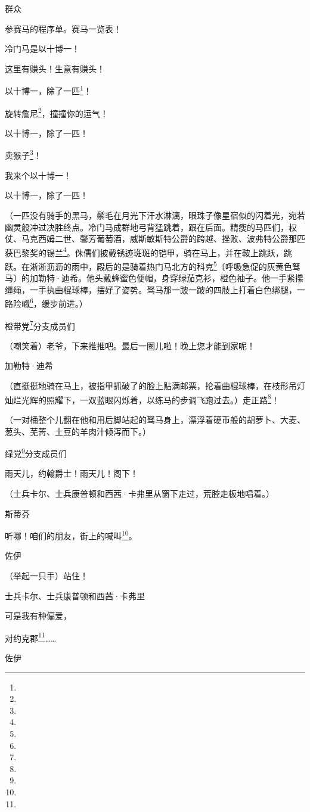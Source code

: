 \par 群众
\par 参赛马的程序单。赛马一览表！
\par 冷门马是以十博一！
\par 这里有赚头！生意有赚头！
\par 以十博一，除了一匹\footnote{}！
\par 旋转詹尼\footnote{}，撞撞你的运气！
\par 以十博一，除了一匹！
\par 卖猴子\footnote{}！
\par 我来个以十博一！
\par 以十博一，除了一匹！
\par （一匹没有骑手的黑马，鬃毛在月光下汗水淋漓，眼珠子像星宿似的闪着光，宛若幽灵般冲过决胜终点。冷门马成群地弓背猛跳着，跟在后面。精瘦的马匹们，权仗、马克西姆二世、馨芳葡萄酒，威斯敏斯特公爵的跨越、挫败、波弗特公爵那匹获巴黎奖的锡兰\footnote{}。侏儒们披戴锈迹斑斑的铠甲，骑在马上，并在鞍上跳跃，跳跃。在淅淅沥沥的雨中，殿后的是骑着热门马北方的科克\footnote{}〔呼吸急促的灰黄色驽马〕的加勒特·迪希。他头戴蜂蜜色便帽，身穿绿茄克衫，橙色袖子。他一手紧攥缰绳，一手执曲棍球棒，摆好了姿势。驽马那一跛一跛的四肢上打着白色绑腿，一路险巇\footnote{}，缓步前进。）
\par 橙带党\footnote{}分支成员们
\par （嘲笑着）老爷，下来推推吧。最后一圈儿啦！晚上您才能到家呢！
\par 加勒特·迪希
\par （直挺挺地骑在马上，被指甲抓破了的脸上贴满邮票，抡着曲棍球棒，在枝形吊灯灿烂光辉的照耀下，一双蓝眼闪烁着，以练马的步调飞跑过去。）走正路\footnote{}！
\par （一对桶整个儿翻在他和用后脚站起的驽马身上，漂浮着硬币般的胡萝卜、大麦、葱头、芜菁、土豆的羊肉汁倾泻而下。）
\par 绿党\footnote{}分支成员们
\par 雨天儿，约翰爵士！雨天儿！阁下！
\par （士兵卡尔、士兵康普顿和西茜·卡弗里从窗下走过，荒腔走板地唱着。）
\par 斯蒂芬
\par 听哪！咱们的朋友，街上的喊叫\footnote{}。
\par 佐伊
\par （举起一只手）站住！
\par 士兵卡尔、士兵康普顿和西茜·卡弗里
\par 可是我有种偏爱，
\par 对约克郡\footnote{}……
\par 佐伊
